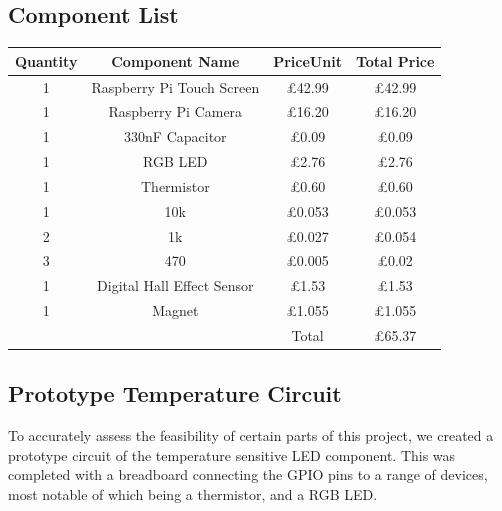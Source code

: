 \documentclass[10pt]{article}
\begin{document}
\subsection{Component List}
\begin{center}
	\begin{tabular}{ | c | c | c | c |}
		\hline
	 	Quantity & Component Name & PriceUnit & Total Price \\ \hline
		1	& Raspberry Pi Touch Screen 	& \pounds 42.99	& \pounds 42.99 \\ \hline
		1 	& Raspberry Pi Camera 	& \pounds 16.20	& \pounds 16.20 \\ \hline
		1	& 330nF Capacitor	& \pounds 0.09	& \pounds 0.09 \\ \hline
		1	& RGB LED   & \pounds 2.76	& \pounds 2.76 \\ \hline
		1	& Thermistor	& \pounds 0.60	& \pounds 0.60 \\ \hline
		1	& 10k\ohm & \pounds 0.053 	& \pounds 0.053 \\ \hline
		2	& 1k\ohm & \pounds 0.027	& \pounds 0.054 \\ \hline
		3	& 470\ohm & \pounds 0.005	& \pounds 0.02 \\ \hline
		1	& Digital Hall Effect Sensor & \pounds 1.53	& \pounds 1.53 \\ \hline
		1	& Magnet & \pounds 1.055	& \pounds 1.055 \\ \hline
			& 	& Total 	& \pounds 65.37 \\ \hline
	\end{tabular}
\end{center}

\newpage
\subsection{Prototype Temperature Circuit}
To accurately assess the feasibility of certain parts of this project, we created a prototype circuit of the temperature sensitive LED component. This was completed with a breadboard connecting the GPIO pins to a range of devices, most notable of which being a thermistor, and a RGB LED.
\end{document}
